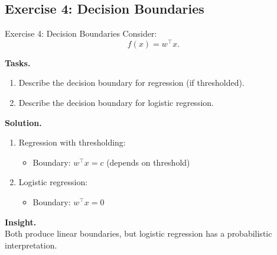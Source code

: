 \documentclass[aspectratio=169,11pt]{beamer}
\begin{document}
\subsection{Exercise 4: Decision Boundaries}
\begin{frame}[t,allowframebreaks]{Exercise 4: Decision Boundaries}
\small
Consider:
\[
f(x) = w^\top x.
\]

\textbf{Tasks.}\\ \begin{enumerate}
    \item Describe the decision boundary for regression (if thresholded).
    \item Describe the decision boundary for logistic regression.
\end{enumerate}

\textbf{Solution.}\\ \begin{enumerate}
\item Regression with thresholding:
\begin{itemize}
    \item Boundary: $w^\top x = c$ (depends on threshold)
\end{itemize}

\item Logistic regression:
\begin{itemize}
    \item Boundary: $w^\top x = 0$
\end{itemize}
\end{enumerate}

\textbf{Insight.}\\ Both produce linear boundaries, but logistic regression has a probabilistic interpretation.
\end{frame}
\end{document}
